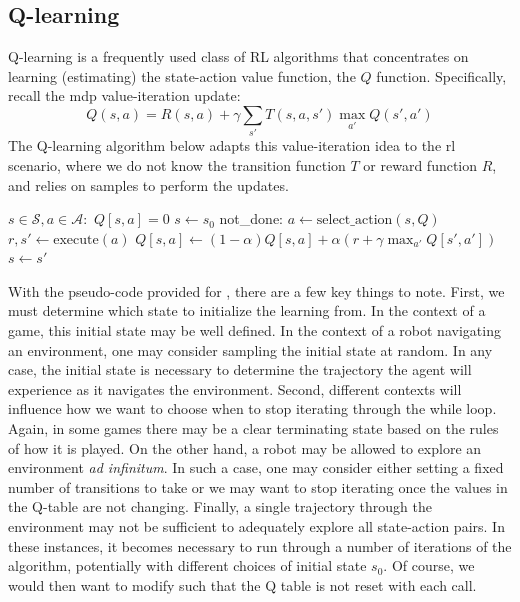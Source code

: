 \subsection{Q-learning}\label{sec-q_learning}
Q-learning is a frequently used class of RL algorithms that
concentrates on learning (estimating) the state-action value function,
the $Q$ function. Specifically, recall the {\sc mdp} value-iteration update:
\begin{equation}
  Q(s,a) = R(s,a) + \gamma \sum_{s'} T(s,a,s')\max_{a'}Q(s',a')
\end{equation}
The Q-learning algorithm below adapts this value-iteration idea to the
  {\sc rl} scenario, where we do not know the transition function $T$ or
reward function $R$, and relies on samples to perform the updates.
\begin{codebox}
  \label{proc:Q_learn}
  \li \For $s \in \mathcal{S}, a \in \mathcal{A}:$
  \li   \Do
  $Q[s, a] = 0$
  \End
  \li $s \gets s_0$
  \li \While not\_done:
  \li   \Do
  $a \gets \text{select}\_\text{action}(s, Q)$
  \li     $r,s' \gets \text{execute}(a)$
  \li     $Q[s, a] \leftarrow (1-\alpha)Q[s, a]
    + \alpha(r + \gamma \max_{a'}Q[s',a'])$
  \li $s \gets s'$
\end{codebox}

With the pseudo-code provided for , there are a few
key things to note. First, we must determine which state to initialize the
learning from. In the context of a game, this initial state may be well defined.
In the context of a robot navigating an environment, one may consider
sampling the initial state at random. In any case, the initial state is necessary
to determine the trajectory the agent will experience as it navigates the environment.
Second, different contexts will influence how we want to choose when to stop
iterating through the while loop. Again, in some games there may be a clear
terminating state based on the rules of how it is played. On the other hand,
a robot may be allowed to explore an environment \emph{ad infinitum}.
In such a case, one may consider either setting a fixed number of transitions to take
or we may want to stop iterating once the values in the Q-table are not changing.
Finally, a single trajectory through the environment may not be sufficient to adequately
explore all state-action pairs. In these instances, it becomes necessary to run
through a number of iterations of the  algorithm, potentially
with different choices of initial state $s_0$. Of course, we would then want to modify  such
that the Q table is not reset with each call.

